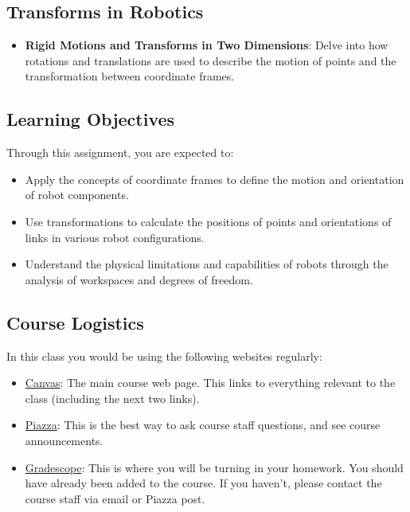 \documentclass{16384_doc}
\begin{document}
\subsection{Transforms in Robotics}

\begin{itemize}
    \item \textbf{Rigid Motions and Transforms in Two Dimensions}: Delve into how rotations and translations are used to describe the motion of points and the transformation between coordinate frames.
\end{itemize}

\subsection{Learning Objectives}

Through this assignment, you are expected to:

\begin{itemize}
    \item Apply the concepts of coordinate frames to define the motion and orientation of robot components.
    \item Use transformations to calculate the positions of points and orientations of links in various robot configurations.
    \item Understand the physical limitations and capabilities of robots through the analysis of workspaces and degrees of freedom.
\end{itemize}

\subsection{Course Logistics}

In this class you would be using the following websites regularly:

\begin{itemize}
    \item \href{https://canvas.cmu.edu/courses/56566}{Canvas}: The main course web page. This links to everything relevant to the class (including the next two links).
    \item \href{https://canvas.cmu.edu/courses/56566/external_tools/11046}{Piazza}: This is the best way to ask course staff questions, and see course announcements.
    \item \href{https://canvas.cmu.edu/courses/56566/external_tools/11047?display=borderless}{Gradescope}: This is where you will be turning in your homework. You should have already been added to the course. If you haven't, please contact the course staff via email or Piazza post.
\end{itemize}
\end{document}
